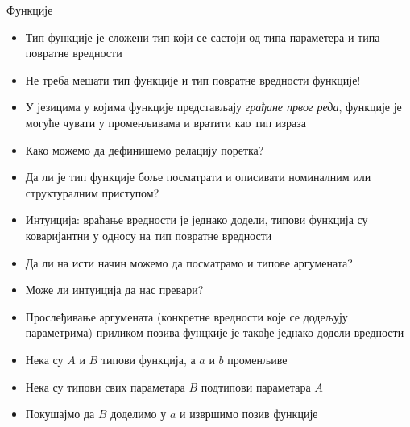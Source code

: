 \documentclass[xcolor=table]{beamer}
\begin{document}
    \begin{frame}[allowframebreaks]{Функције}
        \begin{itemize}
            \item Тип функције је сложени тип који се састоји од типа параметера и типа повратне вредности
            \item Не треба мешати тип функције и тип повратне вредности функције!
            \item У језицима у којима функције представљају \textit{грађане првог реда}, функције је могуће чувати у променљивама и вратити као тип израза
            \item Како можемо да дефинишемо релацију поретка?
            \item Да ли је тип функције боље посматрати и описивати номиналним или структуралним приступом?
        \end{itemize}

        \framebreak

        \begin{itemize}
            \item Интуиција: враћање вредности је једнако додели, типови функција су коваријантни у односу на тип повратне вредности
            \item Да ли на исти начин можемо да посматрамо и типове аргумената?
            \item Може ли интуиција да нас превари?
        \end{itemize}

        \framebreak

        \begin{itemize}
            \item Прослеђивање аргумената (конкретне вредности које се додељују параметрима) приликом позива фунцкије је такође једнако додели вредности
            \item Нека су \begin{math}A\end{math} и \begin{math}B\end{math} типови функција, а \begin{math}a\end{math} и \begin{math}b\end{math} променљиве
            \item Нека су типови свих параметара \begin{math}B\end{math} подтипови параметара \begin{math}A\end{math}
            \item Покушајмо да \begin{math}B\end{math} доделимо у \begin{math}a\end{math} и извршимо позив функције
        \end{itemize}
        

\end{frame}
\end{document}
